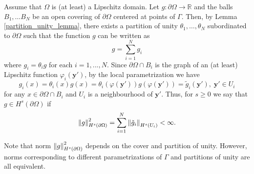 Assume that \(\Omega\) is (at least) a Lipschitz domain. Let \(g: \partial\Omega \rightarrow \mathbb{R}\) and the balls \(B_1,\dots B_N\) be an open covering of \(\partial\Omega\) centered at points of \(\Gamma\). Then, by Lemma \ref{partition_unity_lemma}, there exists a partition of unity \(\theta_1,\dots, \theta_N\) subordinated to \(\partial\Omega\) such that the function \(g\) can be written as
\[
    g = \sum_{i=1}^{N} g_i
\]
where \(g_i = \theta_i g\) for each \(i=1,...,N\). Since \(\partial\Omega \cap B_i\) is the graph of an (at least) Lipschitz function \(\varphi_i(\mathbf{y}')\), by the local parametrization we have
\[
    g_i(x) = \theta_i(x) g(x) = \theta_i(\varphi(\mathbf{y}')) g(\varphi(\mathbf{y}')) = \tilde{g}_i(\mathbf{y}'), \; \mathbf{y}' \in U_i
\]
for any \(x \in \partial\Omega \cap B_i\) and \(U_i\) is a neighbourhood of \(\mathbf{y}'\). Thus, for \(s \geq 0\) we say that \(g \in H^s(\partial\Omega)\) if 
\[
    \norm{g}_{H^s(\partial\Omega)}^2 = \sum_{i=1}^{N} \norm{\tilde{g}_i}_{H^s(U_i)} < \infty.
\]

Note that norm \(\norm{g}_{H^s(\partial\Omega)}^2\) depends on the cover and partition of unity. However, norms corresponding to different parametrizations of \(\Gamma\) and partitions of unity are all equivalent.